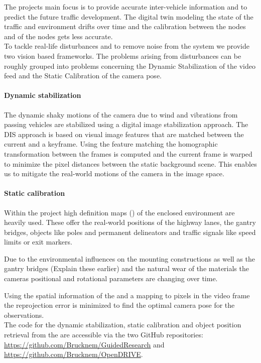The projects main focus is to provide accurate inter-vehicle information and to predict the future traffic development.
The digital twin modeling the state of the traffic and environment drifts over time and the calibration between the nodes and of the nodes gets less accurate.
\\

To tackle real-life disturbances and to remove noise from the system we provide two vision based frameworks. 
The problems arising from disturbances can be roughly grouped into problems concerning the Dynamic Stabilization of the video feed and the Static Calibration of the camera pose.

\paragraph{Dynamic stabilization}
The dynamic shaky motions of the camera due to wind and vibrations from passing vehicles are stabilized using a digital image stabilization approach.
The DIS approach is based on visual image features that are matched between the current and a keyframe. 
Using the feature matching the homographic transformation between the frames is computed and the current frame is warped to minimize the pixel distances between the static background scene.
This enables us to mitigate the real-world motions of the camera in the image space.

\paragraph{Static calibration}
Within the project high definition maps (\HDmaps) of the enclosed environment are heavily used. 
These \HDmaps{} offer the real-world positions of the highway lanes, the gantry bridges, objects like poles and permanent delineators and traffic signals like speed limits or exit markers.

Due to the environmental influences on the mounting constructions as well as the gantry bridges (Explain these earlier) and the natural wear of the materials the cameras positional and rotational parameters are changing over time. 

Using the spatial information of the \HDmaps{} and a mapping to pixels in the video frame the reprojection error is minimized to find the optimal camera pose for the observations.\\

The code for the dynamic stabilization, static calibration and object position retrieval from the \HDmaps{} are accessible via the two GitHub repositories: \url{https://github.com/Brucknem/GuidedResearch} and \url{https://github.com/Brucknem/OpenDRIVE}.

